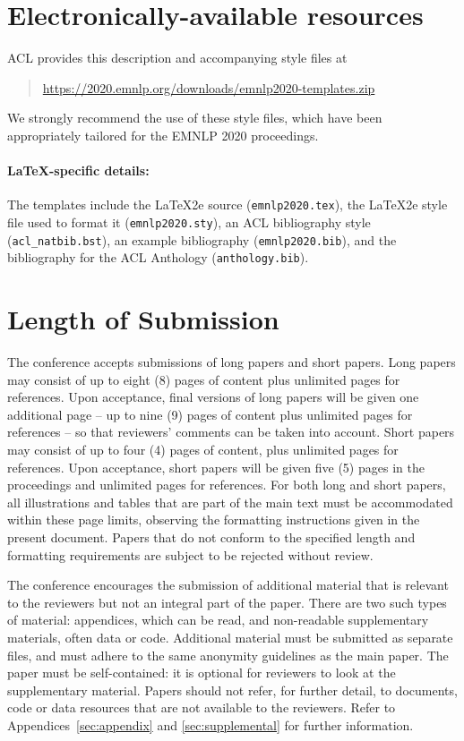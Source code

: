 \documentclass[11pt,a4paper]{article}
\begin{document}
\section{Electronically-available resources}

ACL provides this description and accompanying style files at
\begin{quote}
\url{https://2020.emnlp.org/downloads/emnlp2020-templates.zip}
\end{quote}
We strongly recommend the use of these style files, which have been appropriately tailored for the EMNLP 2020 proceedings.

\paragraph{\LaTeX-specific details:}
The templates include the \LaTeX2e{} source (\texttt{\small emnlp2020.tex}),
the \LaTeX2e{} style file used to format it (\texttt{\small emnlp2020.sty}),
an ACL bibliography style (\texttt{\small acl\_natbib.bst}),
an example bibliography (\texttt{\small emnlp2020.bib}),
and the bibliography for the ACL Anthology (\texttt{\small anthology.bib}).


\section{Length of Submission}
\label{sec:length}

The conference accepts submissions of long papers and short papers.
Long papers may consist of up to eight (8) pages of content plus unlimited pages for references.
Upon acceptance, final versions of long papers will be given one additional page -- up to nine (9) pages of content plus unlimited pages for references -- so that reviewers' comments can be taken into account.
Short papers may consist of up to four (4) pages of content, plus unlimited pages for references.
Upon acceptance, short papers will be given five (5) pages in the proceedings and unlimited pages for references. 
For both long and short papers, all illustrations and tables that are part of the main text must be accommodated within these page limits, observing the formatting instructions given in the present document.
Papers that do not conform to the specified length and formatting requirements are subject to be rejected without review.

The conference encourages the submission of additional material that is relevant to the reviewers but not an integral part of the paper.
There are two such types of material: appendices, which can be read, and non-readable supplementary materials, often data or code.
Additional material must be submitted as separate files, and must adhere to the same anonymity guidelines as the main paper.
The paper must be self-contained: it is optional for reviewers to look at the supplementary material.
Papers should not refer, for further detail, to documents, code or data resources that are not available to the reviewers.
Refer to Appendices~\ref{sec:appendix} and \ref{sec:supplemental} for further information. 
\end{document}
